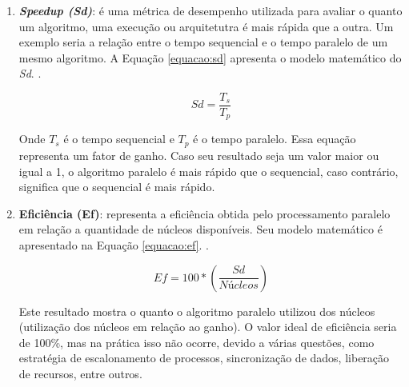 \begin{enumerate} 
	
	\item \textbf{\textit{Speedup (Sd)}}: é uma métrica de desempenho utilizada para avaliar o quanto um algoritmo, uma execução ou arquitetutra é mais rápida que a outra. Um exemplo seria a relação entre o tempo sequencial e o tempo paralelo de um mesmo algoritmo. A Equação \ref{equacao:sd} apresenta o modelo matemático do \textit{Sd}. \cite{rodrigues:2012:proposta}.
	
	\begin{equation} \label{equacao:sd}
	Sd=\frac{T_s}{T_p}
	\end{equation}
	
	Onde $T_s$ é o tempo sequencial e $T_p$ é o tempo paralelo. Essa equação representa um fator de ganho. Caso seu resultado seja um valor maior ou igual a 1, o algoritmo paralelo é mais rápido que o sequencial, caso contrário, significa que o sequencial é mais rápido.
	
	\item \textbf{Eficiência (Ef)}: representa a eficiência obtida pelo processamento paralelo em relação a quantidade de núcleos disponíveis. Seu modelo matemático é apresentado na Equação \ref{equacao:ef}. \cite{rodrigues:2012:proposta}.
	
	\begin{equation} \label{equacao:ef}
	Ef=100*(\frac{Sd}{Núcleos})
	\end{equation}
	
	Este resultado mostra o quanto o algoritmo paralelo utilizou dos núcleos (utilização dos núcleos em relação ao ganho). O valor ideal de eficiência seria de 100\%, mas na prática isso não ocorre, devido a várias questões, como estratégia de escalonamento de processos, sincronização de dados, liberação de recursos, entre outros.
	
	
	

\end{enumerate}
